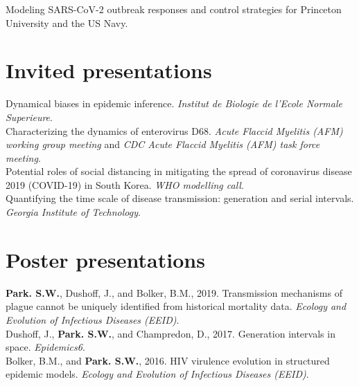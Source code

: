 \documentclass[11pt]{article} %
\begin{document}
Modeling SARS-CoV-2 outbreak responses and control strategies for Princeton University and the US Navy. 

\section*{Invited presentations}

 Dynamical biases in epidemic inference. \textit{Institut de Biologie de l'Ecole Normale Superieure}.\\

 Characterizing the dynamics of enterovirus D68. \textit{Acute Flaccid Myelitis (AFM) working group meeting} and \textit{CDC Acute Flaccid Myelitis (AFM) task force meeting}.\\

 Potential roles of social distancing in mitigating the spread of coronavirus disease 2019 (COVID-19) in South Korea. \textit{WHO modelling call}.\\

 Quantifying the time scale of disease transmission: generation and serial intervals. \textit{Georgia Institute of Technology}.\\

\section*{Poster presentations}

 \textbf{Park. S.W.}, Dushoff, J., and Bolker, B.M., 2019. Transmission mechanisms of plague cannot be uniquely identified from historical mortality data. \textit{Ecology and Evolution of Infectious Diseases (EEID)}.\\

 Dushoff, J., \textbf{Park. S.W.}, and Champredon, D., 2017. Generation intervals in space. \textit{Epidemics6}.\\

 Bolker, B.M., and \textbf{Park. S.W.}, 2016. HIV virulence evolution in structured epidemic models. \textit{Ecology and Evolution of Infectious Diseases (EEID)}.\\


\end{document}
